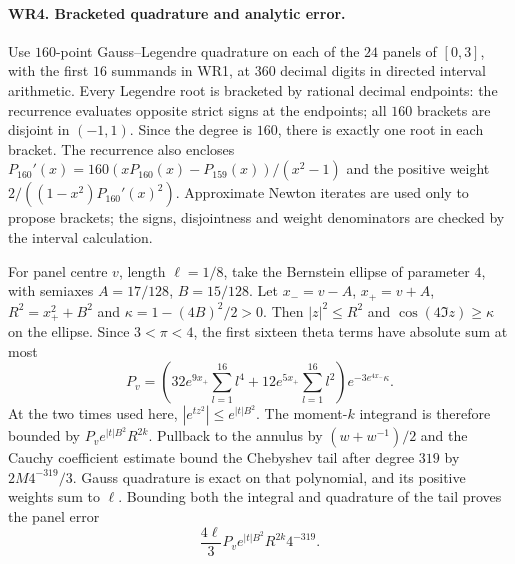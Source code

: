 \documentclass[11pt,a4paper]{article}
\theoremstyle{definition}\newtheorem{definition}[theorem]{Definition}
\begin{document}
\paragraph{WR4. Bracketed quadrature and analytic error.}
Use $160$-point Gauss--Legendre quadrature on each of the $24$
panels of $[0,3]$, with the first $16$ summands in WR1, at
$360$ decimal digits in directed interval arithmetic. Every
Legendre root is bracketed by rational decimal endpoints: the
recurrence evaluates opposite strict signs at the endpoints;
all $160$ brackets are disjoint in $(-1,1)$. Since the degree is
$160$, there is exactly one root in each bracket. The recurrence
also encloses
$P_{160}'(x)=160(xP_{160}(x)-P_{159}(x))/(x^2-1)$ and the
positive weight $2/((1-x^2)P_{160}'(x)^2)$.
Approximate Newton iterates are used only to propose brackets;
the signs, disjointness and weight denominators are checked by
the interval calculation.

For panel centre $v$, length $\ell=1/8$, take the Bernstein
ellipse of parameter $4$, with semiaxes $A=17/128$, $B=15/128$.
Let $x_-=v-A$, $x_+=v+A$, $R^2=x_+^2+B^2$ and
$\kappa=1-(4B)^2/2>0$. Then $|z|^2\le R^2$ and
$\cos(4\Im z)\ge\kappa$ on the ellipse. Since $3<\pi<4$,
the first sixteen theta terms have absolute sum at most
\[
 P_v=\left(32e^{9x_+}\sum_{l=1}^{16}l^4
              +12e^{5x_+}\sum_{l=1}^{16}l^2\right)
                      e^{-3e^{4x_-}\kappa}.
 \tag{WR8}
\]
At the two times used here, $|e^{tz^2}|\le e^{|t|B^2}$.
The moment-$k$ integrand is therefore bounded by
$P_ve^{|t|B^2}R^{2k}$. Pullback to the annulus by
$(w+w^{-1})/2$ and the Cauchy coefficient estimate bound the
Chebyshev tail after degree $319$ by $2M4^{-319}/3$.
Gauss quadrature is exact on that polynomial, and its positive
weights sum to $\ell$. Bounding both the integral and quadrature
of the tail proves the panel error
\[
 \frac{4\ell}{3}P_ve^{|t|B^2}R^{2k}4^{-319}.
 \tag{WR9}
\]
\end{document}
